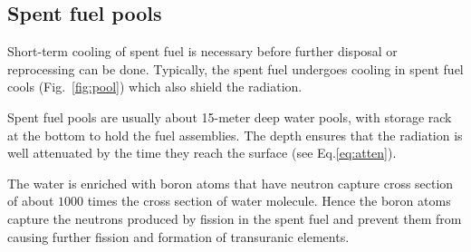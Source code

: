 \documentclass[nofootinbib,preprint,aps]{revtex4-1}
\begin{document}
    \subsection{Spent fuel pools}
    Short-term cooling of spent fuel is necessary before further disposal or reprocessing can be done.
    Typically, the spent fuel undergoes cooling in spent fuel cools (Fig.~\ref{fig:pool}) which also shield the radiation.

    Spent fuel pools  are usually about 15-meter deep water pools,
    with storage rack at the bottom to hold the fuel assemblies. The depth ensures that the radiation
    is well attenuated by the time they reach the surface (see Eq.\ref{eq:atten}).

    The water is enriched with boron atoms that have neutron capture cross section of about $1000$ times
    the cross section of water molecule. Hence the boron atoms capture the neutrons produced by fission
    in the spent fuel
    and prevent them from causing further fission and formation of transuranic elements.
\end{document}
